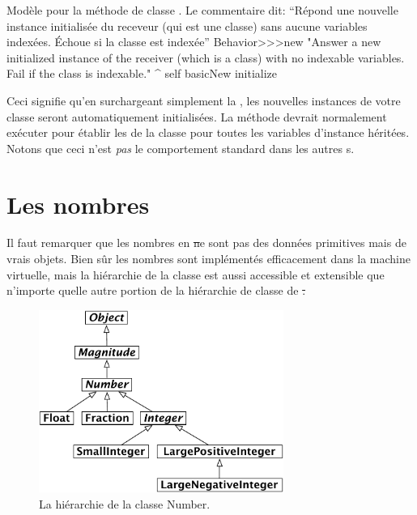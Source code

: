\documentclass[a4paper,10pt,twoside]{book}
\begin{document}
\begin{method}{Mod\`ele pour la m\'ethode de classe . Le commentaire dit: ``R\'epond une nouvelle instance initialis\'ee du receveur (qui est une classe) sans aucune variables index\'ees. \'Echoue si la classe est index\'ee''}
Behavior>>>new
    "Answer a new initialized instance of the receiver (which is a class) with no indexable variables. Fail if the class is indexable."
    ^ self basicNew initialize
\end{method}

Ceci signifie qu'en surchargeant simplement la  , les nouvelles instances de votre classe seront automatiquement initialis\'ees. La m\'ethode  devrait normalement ex\'ecuter  pour \'etablir les  de la classe pour toutes les variables d'instance h\'erit\'ees.
Notons que ceci n'est \emph{pas} le comportement standard dans les autres \st{}s.

\section{Les nombres}
\label{sec:Number}
Il faut remarquer que les nombres en \st ne sont pas des donn\'ees primitives mais de vrais objets. Bien s\^ur les nombres sont impl\'ement\'es efficacement dans la machine virtuelle, mais la hi\'erarchie de la classe  est aussi accessible et extensible que n'importe quelle autre portion de la hi\'erarchie de classe de \st.

\begin{figure}[ht]
\centerline {\includegraphics[width=8cm]{NumberHierarchy}}
\caption{La hi\'erarchie de la classe Number.\label{fig:numbers}}
\end{figure}
\end{document}
